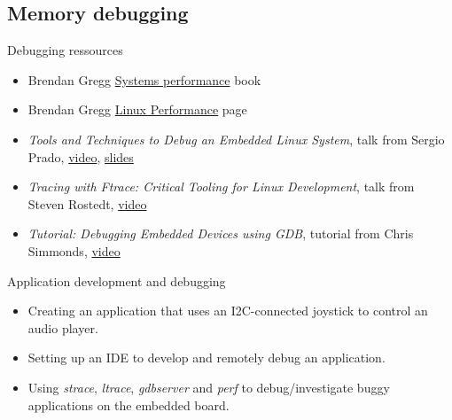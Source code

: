 \subsection{Memory debugging}



\begin{frame}{Debugging ressources}
  \begin{itemize}
  \item Brendan Gregg
    \href{https://www.brendangregg.com/systems-performance-2nd-edition-book.html}{Systems
      performance} book
  \item Brendan Gregg
    \href{https://www.brendangregg.com/linuxperf.html}{Linux
      Performance} page
  \item {\em Tools and Techniques to Debug an Embedded Linux System},
    talk from Sergio Prado,
    \href{https://www.youtube.com/watch?v=dgPkZnGuIMg}{video},
    \href{https://elinux.org/images/c/cf/Slides-debugging.pdf}{slides}
  \item {\em Tracing with Ftrace: Critical Tooling for Linux
      Development}, talk from Steven Rostedt,
    \href{https://www.youtube.com/watch?v=mlxqpNvfvEQ}{video}
  \item {\em Tutorial: Debugging Embedded Devices using GDB}, tutorial
    from Chris Simmonds,
    \href{https://www.youtube.com/watch?v=JGhAgd2a_Ck}{video}
  \end{itemize}
\end{frame}

\setuplabframe
{Application development and debugging}
{
  \begin{itemize}
  \item Creating an application that uses an I2C-connected joystick to
    control an audio player.
  \item Setting up an IDE to develop and remotely debug an
    application.
  \item Using {\em strace}, {\em ltrace}, {\em gdbserver} and {\em
      perf} to debug/investigate buggy applications on the embedded
    board.
  \end{itemize}
}


